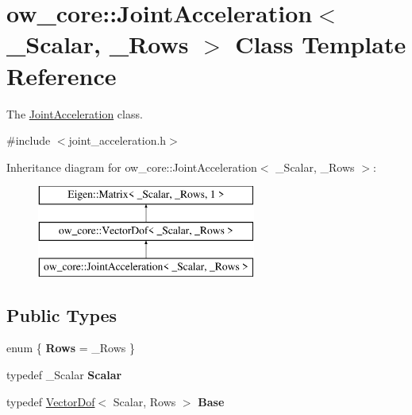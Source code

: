\hypertarget{classow__core_1_1JointAcceleration}{}\section{ow\+\_\+core\+:\+:Joint\+Acceleration$<$ \+\_\+\+Scalar, \+\_\+\+Rows $>$ Class Template Reference}
\label{classow__core_1_1JointAcceleration}


The \hyperlink{classow__core_1_1JointAcceleration}{Joint\+Acceleration} class.  




{\ttfamily \#include $<$joint\+\_\+acceleration.\+h$>$}

Inheritance diagram for ow\+\_\+core\+:\+:Joint\+Acceleration$<$ \+\_\+\+Scalar, \+\_\+\+Rows $>$\+:\begin{figure}[H]
\begin{center}
\leavevmode
\includegraphics[height=3.000000cm]{d9/d9f/classow__core_1_1JointAcceleration}
\end{center}
\end{figure}
\subsection*{Public Types}
\begin{DoxyCompactItemize}
\item 
enum \{ {\bfseries Rows} = \+\_\+\+Rows
 \}\hypertarget{classow__core_1_1JointAcceleration_a21c841c75e8afcecd1957adc7406524d}{}\label{classow__core_1_1JointAcceleration_a21c841c75e8afcecd1957adc7406524d}

\item 
typedef \+\_\+\+Scalar {\bfseries Scalar}\hypertarget{classow__core_1_1JointAcceleration_a3aef897869dad7025edeffbc67d1bfd9}{}\label{classow__core_1_1JointAcceleration_a3aef897869dad7025edeffbc67d1bfd9}

\item 
typedef \hyperlink{classow__core_1_1VectorDof}{Vector\+Dof}$<$ Scalar, Rows $>$ {\bfseries Base}\hypertarget{classow__core_1_1JointAcceleration_aa9b376c4517796a54f984b190c1c4dcf}{}\label{classow__core_1_1JointAcceleration_aa9b376c4517796a54f984b190c1c4dcf}

\end{DoxyCompactItemize}
